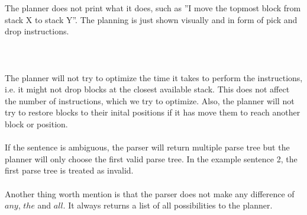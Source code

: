 The planner does not print what it does, such as ''I move the topmost block from stack X to stack Y''. The planning is just shown visually and in form of pick and drop instructions. \\\\\\\\
The planner will not try to optimize the time it takes to perform the instructions, i.e. it might not drop blocks at the closest available stack. This does not affect the number of instructions, which we try to optimize. Also, the planner will not try to restore blocks to their inital positions if it has move them to reach another block or position. 
\\\\
If the sentence is ambiguous, the parser will return multiple parse tree but the planner will only choose the first valid parse tree. In the example sentence 2, the first parse tree is treated as invalid. 
\\\\
Another thing worth mention is that the parser does not make any difference of $any$, $the$ and $all$. It always returns a list of all possibilities to the planner. 
